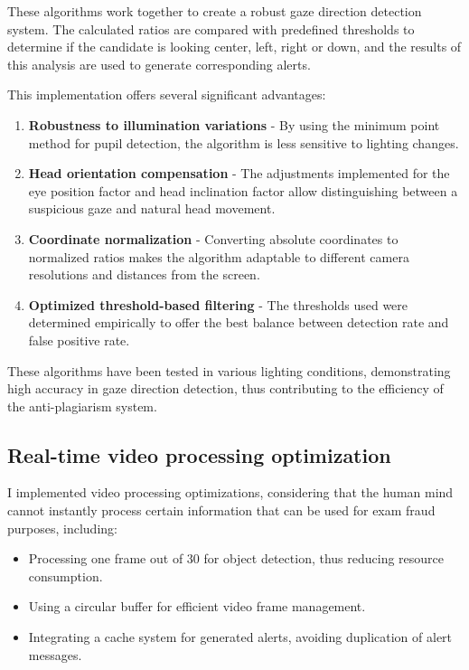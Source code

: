 \documentclass[12pt,a4paper]{article}
\begin{document}
These algorithms work together to create a robust gaze direction detection system. The calculated ratios are compared with predefined thresholds to determine if the candidate is looking center, left, right or down, and the results of this analysis are used to generate corresponding alerts.

This implementation offers several significant advantages:

\begin{enumerate}
    \item \textbf{Robustness to illumination variations} - By using the minimum point method for pupil detection, the algorithm is less sensitive to lighting changes.
    
    \item \textbf{Head orientation compensation} - The adjustments implemented for the eye position factor and head inclination factor allow distinguishing between a suspicious gaze and natural head movement.
    
    \item \textbf{Coordinate normalization} - Converting absolute coordinates to normalized ratios makes the algorithm adaptable to different camera resolutions and distances from the screen.
    
    \item \textbf{Optimized threshold-based filtering} - The thresholds used were determined empirically to offer the best balance between detection rate and false positive rate.
\end{enumerate}

These algorithms have been tested in various lighting conditions, demonstrating high accuracy in gaze direction detection, thus contributing to the efficiency of the anti-plagiarism system.

\subsection{Real-time video processing optimization}
I implemented video processing optimizations, considering that the human mind cannot instantly process certain information that can be used for exam fraud purposes, including:
\begin{itemize}
    \item Processing one frame out of 30 for object detection, thus reducing resource consumption.
    \item Using a circular buffer for efficient video frame management.
    \item Integrating a cache system for generated alerts, avoiding duplication of alert messages.
\end{itemize}
\end{document}
